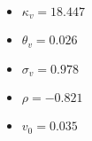 
\begin{itemize}
    \item $\kappa_v = 18.447$
    \item $\theta_v = 0.026$
    \item $\sigma_v = 0.978$
    \item $\rho = -0.821$
    \item $v_0 = 0.035$
\end{itemize}
